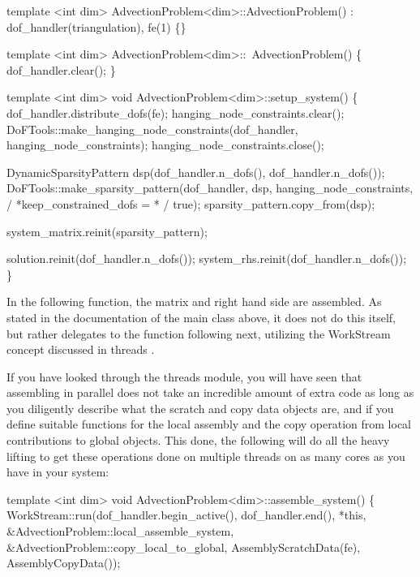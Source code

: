\begin{DoxyCode}
\textcolor{keyword}{template} <\textcolor{keywordtype}{int} dim>
AdvectionProblem<dim>::AdvectionProblem() : dof\_handler(triangulation), fe(1)
\{\}


\textcolor{keyword}{template} <\textcolor{keywordtype}{int} dim>
AdvectionProblem<dim>::~AdvectionProblem()
\{
    dof\_handler.clear();
\}


\textcolor{keyword}{template} <\textcolor{keywordtype}{int} dim>
\textcolor{keywordtype}{void} AdvectionProblem<dim>::setup\_system()
\{
    dof\_handler.distribute\_dofs(fe);
    hanging\_node\_constraints.clear();
    DoFTools::make\_hanging\_node\_constraints(dof\_handler,
                                            hanging\_node\_constraints);
    hanging\_node\_constraints.close();

    DynamicSparsityPattern dsp(dof\_handler.n\_dofs(), dof\_handler.n\_dofs());
    DoFTools::make\_sparsity\_pattern(dof\_handler, dsp, hanging\_node\_constraints,
                                    / *keep\_constrained\_dofs = * / \textcolor{keyword}{true});
    sparsity\_pattern.copy\_from(dsp);

    system\_matrix.reinit(sparsity\_pattern);

    solution.reinit(dof\_handler.n\_dofs());
    system\_rhs.reinit(dof\_handler.n\_dofs());
\}
\end{DoxyCode}


In the following function, the matrix and right hand side are assembled. As stated in the documentation of the main class above, it does not do this itself, but rather delegates to the function following next, utilizing the Work\+Stream concept discussed in threads .

If you have looked through the threads module, you will have seen that assembling in parallel does not take an incredible amount of extra code as long as you diligently describe what the scratch and copy data objects are, and if you define suitable functions for the local assembly and the copy operation from local contributions to global objects. This done, the following will do all the heavy lifting to get these operations done on multiple threads on as many cores as you have in your system\+:


\begin{DoxyCode}
\textcolor{keyword}{template} <\textcolor{keywordtype}{int} dim>
\textcolor{keywordtype}{void} AdvectionProblem<dim>::assemble\_system()
\{
    WorkStream::run(dof\_handler.begin\_active(), dof\_handler.end(), *\textcolor{keyword}{this},
                    &AdvectionProblem::local\_assemble\_system,
                    &AdvectionProblem::copy\_local\_to\_global,
                    AssemblyScratchData(fe), AssemblyCopyData());
\end{DoxyCode}


